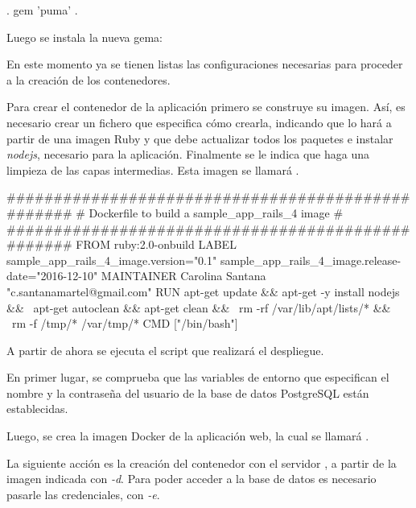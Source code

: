 \begin{codelisting}
\label{code:addpuma}
\begin{code}
.
gem 'puma'
.
\end{code}
\end{codelisting}

Luego se instala la nueva gema: 


En este momento ya se tienen listas las configuraciones necesarias para proceder a la creación de los contenedores.

Para crear el contenedor de la aplicación primero se construye su imagen. Así, es necesario crear un fichero  que especifica cómo crearla, indicando que lo hará a partir de una imagen Ruby y que debe actualizar todos los paquetes e instalar \textit{nodejs}, necesario para la aplicación. Finalmente se le indica que haga una limpieza de las capas intermedias. Esta imagen se llamará . 

\begin{codelisting}
\label{code:dockerfile}
\begin{code}
##################################################
# Dockerfile to build a sample_app_rails_4 image #
##################################################
FROM ruby:2.0-onbuild
LABEL sample_app_rails_4_image.version="0.1" 
      sample_app_rails_4_image.release-date="2016-12-10"
MAINTAINER Carolina Santana "c.santanamartel@gmail.com"
RUN apt-get update && apt-get -y install nodejs && \
    apt-get autoclean && apt-get clean && \
    rm -rf /var/lib/apt/lists/* && \
    rm -f /tmp/* /var/tmp/*
CMD ["/bin/bash"]
\end{code}
\end{codelisting}

A partir de ahora se ejecuta el script que realizará el despliegue. 

En primer lugar, se comprueba que las variables de entorno que especifican el nombre y la contraseña del usuario de la base de datos PostgreSQL están establecidas. 

Luego, se crea la imagen Docker de la aplicación web, la cual se llamará . 

La siguiente acción es la creación del contenedor  con el servidor , a partir de la imagen  indicada con \textit{\--d}. Para poder acceder a la base de datos es necesario pasarle las credenciales, con \textit{\--e}. 

